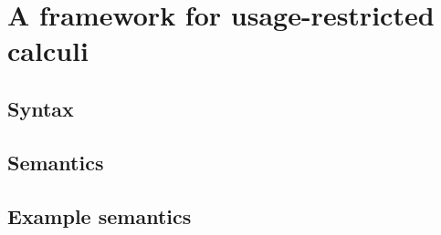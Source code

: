 \chapter{A framework for usage-restricted calculi}

\section{Syntax}



\section{Semantics}



\section{Example semantics}



